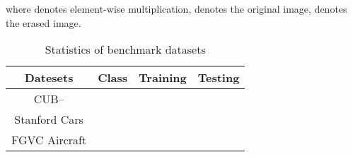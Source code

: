 \documentclass[conference]{IEEEtran}
\begin{document}
where  denotes element-wise multiplication,  denotes the original image,  denotes the erased image.
\begin{table}
\vspace{-2mm}
\begin{center}
\caption{Statistics of benchmark datasets} \label{tab:datasets}
\begin{tabular}{c|c|c|c}
  \hline
  Datesets & Class & Training & Testing  \\
  \hline
  \hline
  CUB-- &  &  &  \\
Stanford Cars &  &  &  \\
FGVC Aircraft &  &  &   \\
  \hline
\end{tabular}
\end{center}
\vspace{-3mm}
\end{table}
\end{document}
